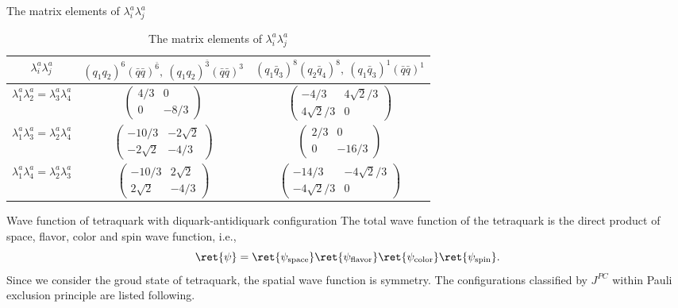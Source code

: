 \begin{frame}{The matrix elements of $\lambda_{i}^{a}\lambda_{j}^{a}$}
    \begin{table}[htbp]
        \begin{tabular}{ccc}
            \toprule[1pt]
            $\lambda_{i}^{a}\lambda_{j}^{a}$                                & $(q_{1}q_{2})^{6}(\bar{q}\bar{q})^{\bar{6}},\ (q_{1}q_{2})^{\bar{3}}(\bar{q}\bar{q})^{3}$ & $(q_{1}\bar{q}_{3})^{8}(q_{2}\bar{q}_{4})^{8},\ (q_{1}\bar{q}_{3})^{1}(\bar{q}\bar{q})^{1}$ \\\midrule
            $\lambda_{1}^{a}\lambda_{2}^{a}=\lambda_{3}^{a}\lambda_{4}^{a}$ & $\begin{pmatrix}4/3&0\\0&-8/3\end{pmatrix}$                                                              & $\begin{pmatrix}-4/3 & 4\sqrt{2}/3\\4\sqrt{2}/3 & 0\end{pmatrix}$                                                                \\
            $\lambda_{1}^{a}\lambda_{3}^{a}=\lambda_{2}^{a}\lambda_{4}^{a}$ & $\begin{pmatrix}-10/3&-2\sqrt{2}\\-2\sqrt{2}&-4/3\end{pmatrix}$     & $\begin{pmatrix} 2/3 & 0\\0&-16/3\end{pmatrix}$                                                                                                                                                       \\
            $\lambda_{1}^{a}\lambda_{4}^{a}=\lambda_{2}^{a}\lambda_{3}^{a}$ & $\begin{pmatrix}-10/3&2\sqrt{2}\\2\sqrt{2}&-4/3\end{pmatrix}$ & $\begin{pmatrix}-14/3 & -4\sqrt{2}/3\\-4\sqrt{2}/3 & 0 \end{pmatrix}$
            \\\bottomrule[1pt]
        \end{tabular}
        \caption{The matrix elements of $\lambda_{i}^{a}\lambda_{j}^{a}$}
    \end{table}
\end{frame}
\begin{frame}{Wave function of tetraquark with diquark-antidiquark configuration}
    The total wave function of the tetraquark is the direct product of space, flavor, color and spin wave function, i.e.,
    \begin{equation}
        \ret{\psi} = \ret{\psi_{\text{space}}}\ret{\psi_{\text{flavor}}}\ret{\psi_{\text{color}}}\ret{\psi_{\text{spin}}}  .
    \end{equation}
    Since we consider the groud state of tetraquark, the spatial wave function is symmetry. The configurations classified by $J^{PC}$ within Pauli exclusion principle are listed following.

\end{frame}
